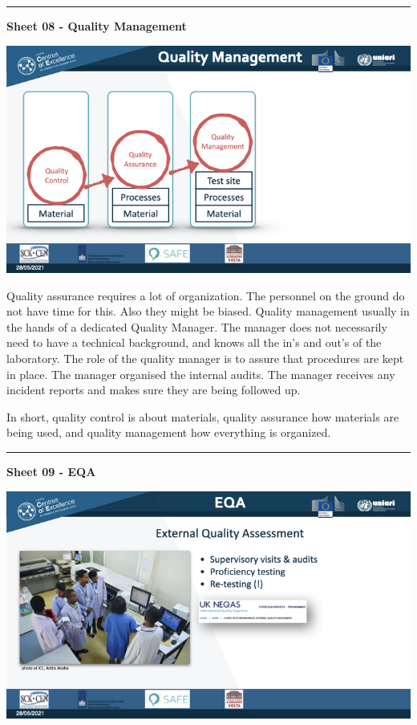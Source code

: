 \documentclass[
]{book}
\begin{document}
\begin{center}\rule{0.5\linewidth}{0.5pt}\end{center}

\textbf{Sheet 08 - Quality Management}

\includegraphics{images/m04/m04_Quality_management_v3.008.jpeg}

Quality assurance requires a lot of organization. The personnel on the
ground do not have time for this. Also they might be biased. Quality
management usually in the hands of a dedicated Quality Manager. The
manager does not necessarily need to have a technical background, and
knows all the in's and out's of the laboratory. The role of the
quality manager is to assure that procedures are kept in place. The
manager organised the internal audits. The manager receives any incident
reports and makes sure they are being followed up.

In short, quality control is about materials, quality assurance how
materials are being used, and quality management how everything is
organized.

\begin{center}\rule{0.5\linewidth}{0.5pt}\end{center}

\textbf{Sheet 09 - EQA}

\includegraphics{images/m04/m04_Quality_management_v3.009.jpeg}
\end{document}
